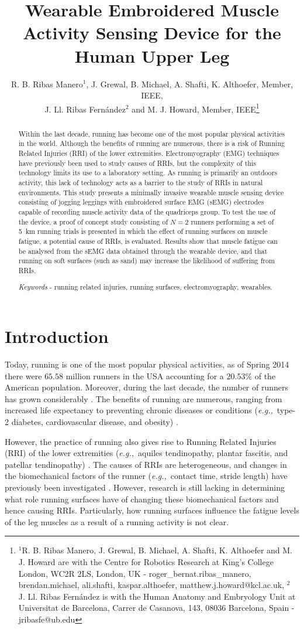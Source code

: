 \documentclass[letterpaper, 10 pt, conference]{ieeeconf}
\title{\LARGE \bf
Wearable Embroidered Muscle Activity Sensing Device for the Human Upper Leg}
\author{R. B. Ribas Manero$^{1}$, J. Grewal, B. Michael, A. Shafti, K. Althoefer, Member, IEEE,\\ J. Ll. Ribas Fern\'{a}ndez$^{2}$ and M. J. Howard, Member, IEEE\thanks{$^{1}$R. B. Ribas Manero, J. Grewal, B. Michael, A. Shafti, K. Althoefer and M. J. Howard are with the Centre for Robotics Research at King's College London, WC2R 2LS, London, UK - roger\_bernat.ribas\_manero, brendan.michael, ali.shafti, kaspar.althoefer, matthew.j.howard@kcl.ac.uk, $^{2}$ J. Ll. Ribas Fern\'{a}ndez is with the Human Anatomy and Embryology Unit at Universitat de Barcelona, Carrer de Casanova, 143, 08036 Barcelona, Spain - jribasfe@ub.edu}}
\newcommand{\eg}[1]{\textit{e.g.,}~#1} \newcommand{\ie}[1]{\textit{i.e.,}~#1}
\begin{document}
\maketitle
\thispagestyle{empty}
\pagestyle{empty}


\begin{abstract}
Within the last decade, running has become one of the most popular physical
activities in the world. Although the benefits of running are numerous, there
is a risk of Running Related Injuries (RRI) of the lower extremities.
Electromyography (EMG) techniques have previously been used to  study causes of
RRIs, but the complexity of this technology limits its use to a laboratory
setting. As running is primarily an outdoors activity, this lack of technology
acts as a barrier to the study of RRIs in natural environments. This study
presents a minimally invasive wearable muscle sensing device consisting of
jogging leggings with embroidered surface EMG (sEMG) electrodes capable of
recording muscle activity data of the quadriceps group. To test the use of the
device, a proof of concept study consisting of $N=2$ runners performing a set
of \SI{5}{\kilo\meter} running trials is presented in which the effect of
running surfaces on muscle fatigue, a potential cause of RRIs, is evaluated.
Results show that muscle fatigue can be analysed from the sEMG data obtained
through the wearable device, and that running on soft surfaces (such as sand)
may increase the likelihood of suffering from RRIs.

\emph{Keywords} - running related injuries, running surfaces, electromyography,
wearables.
\end{abstract}

\section{Introduction}\label{s:introduction}
Today, running is one of the most popular physical activities, as of Spring
2014 there were $65.58$ million runners in the USA accounting for a $20.53\%$
of the American population. Moreover, during the last decade, the number of
runners has grown considerably \cite{paluska2005overview}. The benefits of
running are numerous, ranging from increased life expectancy to preventing
chronic diseases or conditions (\eg{type-2 diabetes, cardiovascular disease,
and obesity}) \cite{o2010abc}. 

However, the practice of running also gives rise to Running Related Injuries
(RRI) of the lower extremities (\eg{aquiles tendinopathy, plantar fascitis, and
patellar tendinopathy}) \cite{van1992running}. The causes of RRIs are
heterogeneous, and changes in the biomechanical factors of the runner
(\eg{contact time, stride length}) have previously been investigated \cite{pinnington2005kinematic}. However, research is still lacking in
determining what role running surfaces have of changing these biomechanical
factors and hence causing RRIs. Particularly, how running surfaces influence
the fatigue levels of the leg muscles as a result of a running activity is not
clear. 
\end{document}
